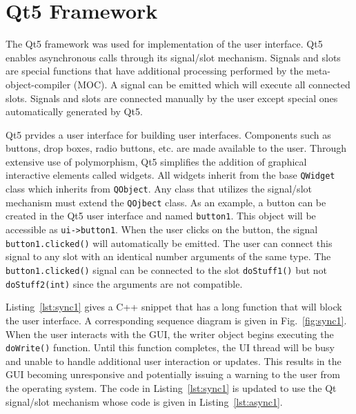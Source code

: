 \section{Qt5 Framework}\label{sec:qt}
The Qt5 framework was used for implementation of the user interface. Qt5 enables asynchronous calls through its signal/slot mechanism. Signals and slots are special functions that have additional processing performed by the meta-object-compiler (MOC). A signal can be emitted which will execute all connected slots. Signals and slots are connected manually by the user except special ones automatically generated by Qt5. 

Qt5 prvides a user interface for building user interfaces. Components such as buttons, drop boxes, radio buttons, etc. are made available to the user. Through extensive use of polymorphism, Qt5 simplifies the addition of graphical interactive elements called widgets. All widgets inherit from the base \texttt{QWidget} class which inherits from \texttt{QObject}. Any class that utilizes the signal/slot mechanism must extend the \texttt{QOjbect} class. As an example, a button can be created in the Qt5 user interface and named \texttt{button1}. This object will be accessible as \texttt{ui->button1}. When the user clicks on the button, the signal \texttt{button1.clicked()} will automatically be emitted. The user can connect this signal to any slot with an identical number arguments of the same type. The \texttt{button1.clicked()} signal can be connected to the slot \texttt{doStuff1()} but not \texttt{doStuff2(int)} since the arguments are not compatible.

Listing~\ref{lst:sync1} gives a C++ snippet that has a long function that will block the user interface. A corresponding sequence diagram is given in Fig.~\ref{fig:sync1}. When the user interacts with the GUI, the writer object begins executing the \texttt{doWrite()} function. Until this function completes, the UI thread will be busy and unable to handle additional user interaction or updates. This results in the GUI becoming unresponsive and potentially issuing a warning to the user from the operating system. The code in Listing~\ref{lst:sync1} is updated to use the Qt signal/slot mechanism whose code is given in Listing~\ref{lst:async1}.

